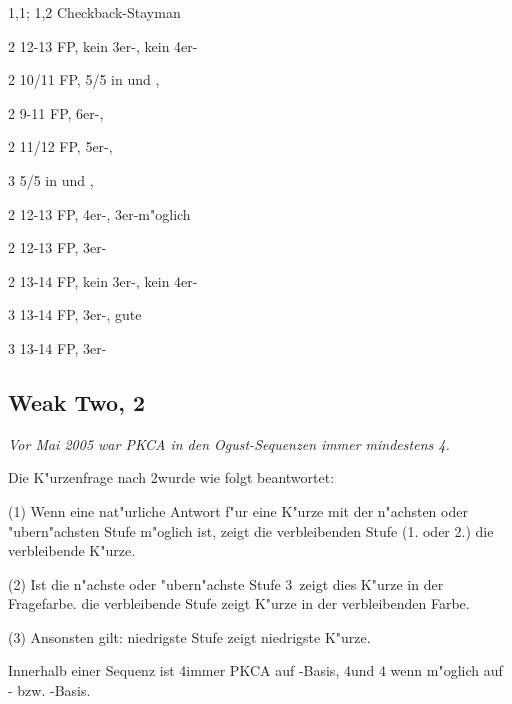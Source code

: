 \begin{appendix}
\bdsc
\item[1\ufa{}\sep1\pik; 1\SA{}\sep2\tre] Checkback-Stayman
 \bdsc
 \item[2\kar] 12-13\bad{} FP, kein 3er-\pi, kein 4er-\co
  \bdsc
  \item[2\coe] 10/11 FP, 5/5 in \co und \pi, \nf
  \item[2\pik] 9-11 FP, 6er-\pi, \nf
  \item[2\SA] 11/12 FP, 5er-\pi, \nf
  \item[3\coe] 5/5 in \co und \pi, \slamint
  \edsc
 \item[2\coe] 12-13\bad{} FP, 4er-\co, 3er-\pi m"oglich
 \item[2\pik] 12-13\bad{} FP, 3er-\pi
 \item[2\SA]  13\good{}-14 FP, kein 3er-\pi, kein 4er-\co
 \item[3\ufa] 13\good{}-14 FP, 3er-\pi, gute \ufa
 \item[3\pik] 13\good{}-14 FP, 3er-\pi
 \edsc
\edsc

\subsection*{Weak Two, 2\coe}

\emph{Vor Mai 2005 war PKCA in den Ogust-Sequenzen immer mindestens 4\tre.}

Die K"urzenfrage nach 2\coe wurde wie folgt beantwortet:

(1) Wenn eine nat"urliche Antwort f"ur eine K"urze mit der n"achsten oder
"ubern"achsten Stufe m"oglich ist, zeigt die verbleibenden Stufe (1. oder 2.)
die verbleibende K"urze.

(2) Ist die n"achste oder "ubern"achste Stufe 3\SA\, zeigt dies K"urze in der
Fragefarbe. die verbleibende Stufe zeigt K"urze in der verbleibenden Farbe.

(3) Ansonsten gilt: niedrigste Stufe zeigt niedrigste K"urze.

Innerhalb einer Sequenz ist 4\pik immer PKCA auf \co-Basis, 4\tre und 4\kar
wenn m"oglich auf \tr- bzw. \ka-Basis.


\end{appendix}

